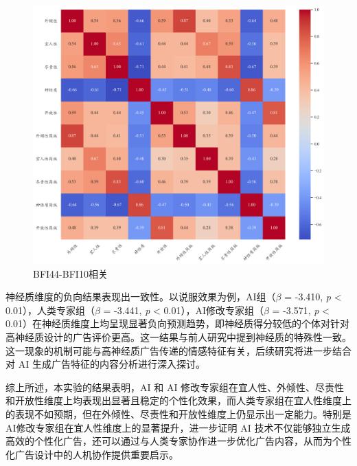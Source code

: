 \begin{figure}[H]
    \centering
    \includegraphics[width=1\linewidth]{Image/BFI44-BFI10相关.png}
    \caption{\label{fig:study2-correlation}BFI44-BFI10相关}
\end{figure}

神经质维度的负向结果表现出一致性。以说服效果为例，AI组（\textit{$\beta$} = -3.410, \textit{p} < 0.01），人类专家组（\textit{$\beta$} = -3.441, \textit{p} < 0.01），AI修改专家组（\textit{$\beta$} = -3.571, \textit{p} < 0.01）在神经质维度上均呈现显著负向预测趋势，即神经质得分较低的个体对针对高神经质设计的广告评价更高。这一结果与前人研究中提到神经质的特殊性一致\citep{matz2024potential}。这一现象的机制可能与高神经质广告传递的情感特征有关，后续研究将进一步结合对 AI 生成广告特征的内容分析进行深入探讨。

综上所述，本实验的结果表明，AI 和 AI 修改专家组在宜人性、外倾性、尽责性和开放性维度上均表现出显著且稳定的个性化效果，而人类专家组在宜人性维度上的表现不如预期，但在外倾性、尽责性和开放性维度上仍显示出一定能力。特别是AI修改专家组在宜人性维度上的显著提升，进一步证明 AI 技术不仅能够独立生成高效的个性化广告，还可以通过与人类专家协作进一步优化广告内容，从而为个性化广告设计中的人机协作提供重要启示。




